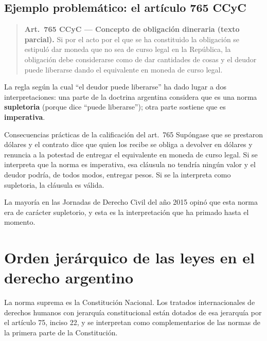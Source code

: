 \documentclass[12pt,oneside]{book}
\begin{document}
\subsection{Ejemplo problemático: el artículo 765 CCyC}

\begin{quote}
\textbf{Art.~765 CCyC --- Concepto de obligación dineraria (texto parcial).} Si por el acto por el que se ha constituido la obligación se estipuló dar moneda que no sea de curso legal en la República, la obligación debe considerarse como de dar cantidades de cosas y el deudor puede liberarse dando el equivalente en moneda de curso legal.
\end{quote}

La regla según la cual ``el deudor puede liberarse'' ha dado lugar a dos interpretaciones: una parte de la doctrina argentina considera que es una norma \textbf{supletoria} (porque dice ``puede liberarse''); otra parte sostiene que es \textbf{imperativa}.

\begin{example}{Consecuencias prácticas de la calificación del art.~765}
Supóngase que se prestaron dólares y el contrato dice que quien los recibe se obliga a devolver en dólares y renuncia a la potestad de entregar el equivalente en moneda de curso legal. Si se interpreta que la norma es imperativa, esa cláusula no tendría ningún valor y el deudor podría, de todos modos, entregar pesos. Si se la interpreta como supletoria, la cláusula es válida.
\end{example}

La mayoría en las Jornadas de Derecho Civil del año 2015 opinó que esta norma era de carácter supletorio, y esta es la interpretación que ha primado hasta el momento.

\section{Orden jerárquico de las leyes en el derecho argentino}

La norma suprema es la Constitución Nacional. Los tratados internacionales de derechos humanos con jerarquía constitucional están dotados de esa jerarquía por el artículo 75, inciso 22, y se interpretan como complementarios de las normas de la primera parte de la Constitución.
\end{document}
